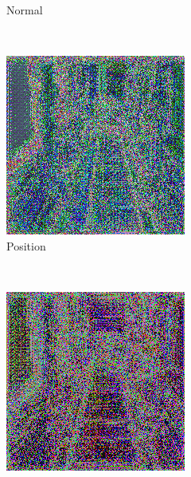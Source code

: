 \begin{figure}[h!]
\begin{subfigure}[b]{0.175\textwidth}
     \caption{Normal}
    \end{subfigure}
    \\ \vspace{0.2cm} %
    \begin{subfigure}[b]{0.175\textwidth}
     \includegraphics[width=\textwidth]{figures/result/triple/depth_albedo_position/2.png}
     \caption{Position}\label{subfig:1}
    \end{subfigure}
    ~
    \begin{subfigure}[b]{0.175\textwidth}
     \includegraphics[width=\textwidth]{figures/result/triple/depth_albedo_roughness/2.png}

\end{subfigure}
\end{figure}
